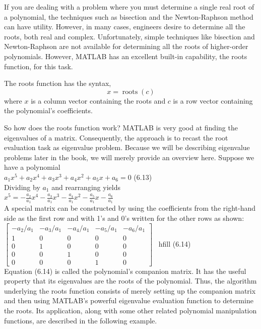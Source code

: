 \documentclass[../main.tex]{subfiles}
\begin{document}
\noindent If you are dealing with a problem where you must determine a single real root of a polynomial, the techniques such as bisection and the Newton-Raphson method can have utility. However, in many cases, engineers desire to determine all the roots, both real and complex. Unfortunately, simple techniques like bisection and Newton-Raphson are not available for determining all the roots of higher-order polynomials. However, MATLAB has an excellent built-in capability, the roots function, for this task.

The roots function has the syntax,
$$
x=\operatorname{roots}(c)
$$
where $x$ is a column vector containing the roots and $c$ is a row vector containing the polynomial's coefficients.

So how does the roots function work? MATLAB is very good at finding the eigenvalues of a matrix. Consequently, the approach is to recast the root evaluation task as eigenvalue problem. Because we will be describing eigenvalue problems later in the book, we will merely provide an overview here.
Suppose we have a polynomial\\

$a_{1} x^{5}+a_{2} x^{4}+a_{3} x^{3}+a_{4} x^{2}+a_{5} x+a_{6}=0$ \hfill (6.13)\\

\noindent Dividing by $a_{1}$ and rearranging yields\\

$x^{5}=-\frac{a_{2}}{a_{1}} x^{4}-\frac{a_{3}}{a_{1}} x^{3}-\frac{a_{4}}{a_{1}} x^{2}-\frac{a_{5}}{a_{1}} x-\frac{a_{6}}{a_{1}}$\\

\noindent A special matrix can be constructed by using the coefficients from the right-hand side as the first row and with 1's and 0's written for the other rows as shown:\\

$
\left[\begin{array}{ccccc}
-a_{2} / a_{1} & -a_{3} / a_{1} & -a_{4} / a_{1} & -a_{5} / a_{1} & -a_{6} / a_{1} \\
1 & 0 & 0 & 0 & 0 \\
0 & 1 & 0 & 0 & 0 \\
0 & 0 & 1 & 0 & 0 \\
0 & 0 & 0 & 1 & 0
\end{array}\right]
$ \ hfill (6.14)\\

Equation (6.14) is called the polynomial's companion matrix. It has the useful property that its eigenvalues are the roots of the polynomial. Thus, the algorithm underlying the roots function consists of merely setting up the companion matrix and then using MATLAB's powerful eigenvalue evaluation function to determine the roots. Its application, along with some other related polynomial manipulation functions, are described in the following example.
\end{document}
